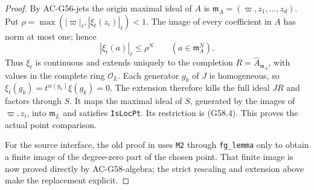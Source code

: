 \begin{proof}
By AC-G56-jets the origin maximal ideal of
$A$ is
$\mathfrak m_A=(\varpi,z_1,\ldots,z_d)$.
Put
$\rho=\max(|\varpi|_\ell,|\xi_t(z_i)|_\ell)<1$.
The image of every coefficient in $A$ has
norm at most one; hence
\[
           |\xi_t(a)|_\ell\leq\rho^N
                       \qquad(a\in\mathfrak m_A^N).
                                                               \tag{G58.7}
\]
Thus $\xi_t$ is continuous and extends uniquely
to the completion $R=\widehat A_{\mathfrak m_A}$,
with values in the complete ring $\mathcal O_L$.
Each generator $g_k$ of $J$ is homogeneous,
so $\xi_t(g_k)=t^{w(g_k)}\xi(g_k)=0$.
The extension therefore kills the full ideal
$JR$ and factors through $S$.
It maps the maximal ideal of $S$, generated
by the images of $\varpi,z_i$, into
$\mathfrak m_L$ and satisfies \texttt{IsLocPt}.
Its restriction is (G58.4).
This proves the actual point comparison.

For the source interface, the old proof in
uses \texttt{M2} through \texttt{fg\_lemma}
only to obtain a finite image of the degree-zero
part of the chosen point.
That finite image is now proved directly by
AC-G58-algebra; the strict rescaling and extension
above make the replacement explicit.
\end{proof}

